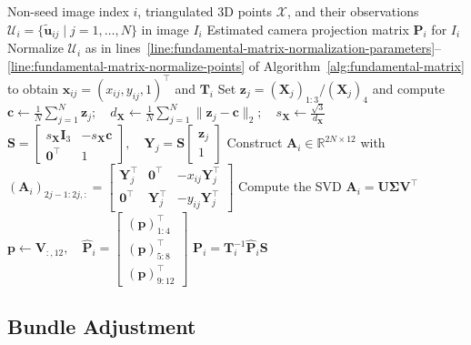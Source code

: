 \documentclass[11pt,a4paper]{article}
\begin{document}
\begin{algorithm}[htbp]
  \caption{Estimation of the Projection Matrix for a Non-seed Image}
  \label{alg:projective-matrix-nonseed}
  \begin{algorithmic}[1]
    \Require Non-seed image index \(i\), triangulated 3D points \(\mathcal{X}\), and their observations \(\mathcal{U}_i = \{\tilde{\mathbf u}_{ij} \mid j = 1, \dots, N\}\) in image \(I_i\)
    \Ensure Estimated camera projection matrix \(\mathbf P_i\) for \(I_i\)
    \State Normalize \(\mathcal{U}_i\) as in lines~\ref{line:fundamental-matrix-normalization-parameters}--\ref{line:fundamental-matrix-normalize-points} of Algorithm~\ref{alg:fundamental-matrix} to obtain \(\mathbf{x}_{ij} = (x_{ij},y_{ij},1)^\top\) and \(\mathbf{T}_i\)
    \State Set \(\mathbf z_j = (\mathbf X_j)_{1:3}/(\mathbf X_j)_4\) and compute
    \(\mathbf c \gets \frac{1}{N}\sum_{j=1}^{N}\mathbf z_j; \quad
d_{\mathbf{X}} \gets \frac{1}{N}\sum_{j=1}^{N}\|\mathbf z_j-\mathbf c\|_2; \quad
s_{\mathbf{X}} \gets \frac{\sqrt{3}}{d_{\mathbf{X}}}\)
    \State \(\mathbf S=\begin{bmatrix}
s_{\mathbf{X}} \mathbf I_3 & -s_{\mathbf{X}} \mathbf c\\
\mathbf 0^\top & 1
\end{bmatrix}, \quad \mathbf Y_j = \mathbf S\begin{bmatrix}\mathbf z_j \\ 1\end{bmatrix}\)
    \State Construct \(\mathbf A_i \in \mathbb R^{2N \times 12}\) with \((\mathbf A_i)_{2j-1:2j,:} = \begin{bmatrix}
\mathbf Y_j^\top & \mathbf 0^\top & -x_{ij}\mathbf Y_j^\top\\
\mathbf 0^\top & \mathbf Y_j^\top & -y_{ij}\mathbf Y_j^\top
\end{bmatrix}\)
    \State Compute the SVD \(\mathbf A_i = \mathbf U\boldsymbol{\Sigma}\mathbf V^\top\)
    \State \(\mathbf p \gets \mathbf V_{:,12}, \quad
\hat{\mathbf P}_i=\begin{bmatrix}
(\mathbf p)_{1:4}^\top\\
(\mathbf p)_{5:8}^\top\\
(\mathbf p)_{9:12}^\top
\end{bmatrix}\)
    \State \Return \(\mathbf{P}_i = \mathbf T_i^{-1} \hat{\mathbf P}_i \mathbf S\)
  \end{algorithmic}
\end{algorithm}

\subsection{Bundle Adjustment}
\label{sec:bundle-adjustment}
\end{document}
